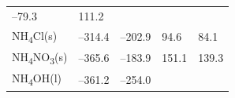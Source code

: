 \documentclass[
  9pt,
]{extbook}
\theoremstyle{definition}
\theoremstyle{definition}
\theoremstyle{definition}
\theoremstyle{remark}
\begin{document}
\begin{longtable}[]{@{}lllll@{}}
\begin{minipage}[t]{0.20\columnwidth}
--79.3\strut
\end{minipage} & \begin{minipage}[t]{0.18\columnwidth}\raggedright
111.2\strut
\end{minipage} & \begin{minipage}[t]{0.18\columnwidth}\raggedright
\strut
\end{minipage}\tabularnewline
\begin{minipage}[t]{0.10\columnwidth}\raggedright
NH\textsubscript{4}Cl(s)\strut
\end{minipage} & \begin{minipage}[t]{0.19\columnwidth}\raggedright
--314.4\strut
\end{minipage} & \begin{minipage}[t]{0.20\columnwidth}\raggedright
--202.9\strut
\end{minipage} & \begin{minipage}[t]{0.18\columnwidth}\raggedright
94.6\strut
\end{minipage} & \begin{minipage}[t]{0.18\columnwidth}\raggedright
84.1\strut
\end{minipage}\tabularnewline
\begin{minipage}[t]{0.10\columnwidth}\raggedright
NH\textsubscript{4}NO\textsubscript{3}(s)\strut
\end{minipage} & \begin{minipage}[t]{0.19\columnwidth}\raggedright
--365.6\strut
\end{minipage} & \begin{minipage}[t]{0.20\columnwidth}\raggedright
--183.9\strut
\end{minipage} & \begin{minipage}[t]{0.18\columnwidth}\raggedright
151.1\strut
\end{minipage} & \begin{minipage}[t]{0.18\columnwidth}\raggedright
139.3\strut
\end{minipage}\tabularnewline
\begin{minipage}[t]{0.10\columnwidth}\raggedright
NH\textsubscript{4}OH(l)\strut
\end{minipage} & \begin{minipage}[t]{0.19\columnwidth}\raggedright
--361.2\strut
\end{minipage} & \begin{minipage}[t]{0.20\columnwidth}\raggedright
--254.0\strut
\end{minipage} & \begin{minipage}[t]{0.18\columnwidth}\raggedright

\end{minipage}
\end{longtable}
\end{document}

